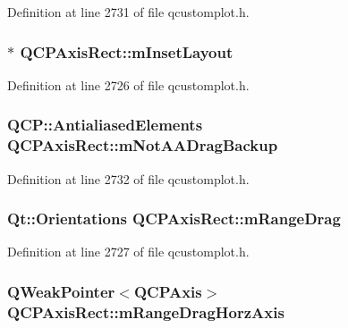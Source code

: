 Definition at line 2731 of file qcustomplot.\-h.

\hypertarget{class_q_c_p_axis_rect_a255240399e0fd24baad80cbbe46f698a}{
\subsubsection[{m\-Inset\-Layout}]{$\ast$ Q\-C\-P\-Axis\-Rect\-::m\-Inset\-Layout\hspace{0.3cm}{\ttfamily [protected]}}}\label{class_q_c_p_axis_rect_a255240399e0fd24baad80cbbe46f698a}


Definition at line 2726 of file qcustomplot.\-h.

\hypertarget{class_q_c_p_axis_rect_a6fcb12e052e276d57efbb128be31d6f5}{
\subsubsection[{m\-Not\-A\-A\-Drag\-Backup}]{\setlength{\rightskip}{0pt plus 5cm}Q\-C\-P\-::\-Antialiased\-Elements Q\-C\-P\-Axis\-Rect\-::m\-Not\-A\-A\-Drag\-Backup\hspace{0.3cm}{\ttfamily [protected]}}}\label{class_q_c_p_axis_rect_a6fcb12e052e276d57efbb128be31d6f5}


Definition at line 2732 of file qcustomplot.\-h.

\hypertarget{class_q_c_p_axis_rect_aa9f107f66ca3469ad50ee6cea7c9e237}{
\subsubsection[{m\-Range\-Drag}]{\setlength{\rightskip}{0pt plus 5cm}Qt\-::\-Orientations Q\-C\-P\-Axis\-Rect\-::m\-Range\-Drag\hspace{0.3cm}{\ttfamily [protected]}}}\label{class_q_c_p_axis_rect_aa9f107f66ca3469ad50ee6cea7c9e237}


Definition at line 2727 of file qcustomplot.\-h.

\hypertarget{class_q_c_p_axis_rect_ad968e82c00bed35250f2fa1394e2434f}{
\subsubsection[{m\-Range\-Drag\-Horz\-Axis}]{\setlength{\rightskip}{0pt plus 5cm}Q\-Weak\-Pointer$<${\bf Q\-C\-P\-Axis}$>$ Q\-C\-P\-Axis\-Rect\-::m\-Range\-Drag\-Horz\-Axis\hspace{0.3cm}{\ttfamily [protected]}}}\label{class_q_c_p_axis_rect_ad968e82c00bed35250f2fa1394e2434f}


